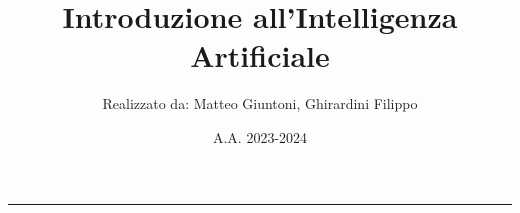 \documentclass[a4paper,10pt]{article}
\title{\textbf{Introduzione all'Intelligenza Artificiale}}
\author{Realizzato da: Matteo Giuntoni, Ghirardini Filippo}
\date{A.A. 2023-2024}
\theoremstyle{remark}
\theoremstyle{definition}
\theoremstyle{plain}
\theoremstyle{definition}
\theoremstyle{definition}
\theoremstyle{definition}
\theoremstyle{plain}
\theoremstyle{plain}
\begin{document}
	
	
	\tableofcontents
	\newpage
	\maketitle
	\begin{center}
		\vspace{-20pt}
		\rule{11cm}{.1pt} 
	\end{center}
	
	
	
	
	
\end{document}
